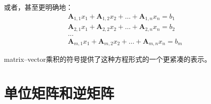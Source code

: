 或者，甚至更明确地：
\begin{align}
  \pmb{A}_{1,1}x_1 + \pmb{A}_{1,2}x_2 + \ldots + \pmb{A}_{1,n}x_n = b_1 \\
  \pmb{A}_{2,1}x_1 + \pmb{A}_{2,2}x_2 + \ldots + \pmb{A}_{2,n}x_n = b_2 \\
  \ldots & \\
  \pmb{A}_{m,1}x_1 + \pmb{A}_{m,2}x_2 + \ldots + \pmb{A}_{m,n}x_n = b_m
\end{align}

\gls*{matrix}--\gls*{vector}乘积的符号提供了这种方程形式的一个更紧凑的表示。

\section{单位矩阵和逆矩阵}
\label{sec:identity_and_inverse_matrices}

